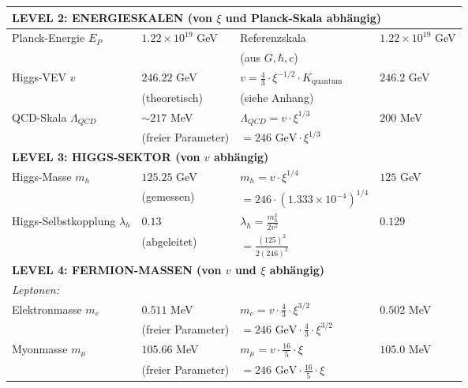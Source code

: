 \documentclass[12pt,a4paper]{article}
\begin{document}
\begin{longtable}{p{4.5cm}p{3.5cm}p{3.5cm}p{3.5cm}}
		\midrule
		\multicolumn{4}{l}{\textbf{LEVEL 2: ENERGIESKALEN (von $\xi$ und Planck-Skala abhängig)}} \\
		\midrule
		
		Planck-Energie $E_P$ & $1.22 \times 10^{19}$ GeV & Referenzskala & $1.22 \times 10^{19}$ GeV \\
		& & (aus $G, \hbar, c$) & \\[0.3em]
		
		Higgs-VEV $v$ & $246.22$ GeV & $v = \frac{4}{3} \cdot \xi^{-1/2} \cdot K_{\text{quantum}}$ & $246.2$ GeV \\
		& (theoretisch) & (siehe Anhang) & \\[0.3em]
		
		QCD-Skala $\Lambda_{QCD}$ & $\sim 217$ MeV & $\Lambda_{QCD} = v \cdot \xi^{1/3}$ & $200$ MeV \\
		& (freier Parameter) & $= 246 \text{ GeV} \cdot \xi^{1/3}$ & \\[0.3em]
		
		\midrule
		\multicolumn{4}{l}{\textbf{LEVEL 3: HIGGS-SEKTOR (von $v$ abhängig)}} \\
		\midrule
		
		Higgs-Masse $m_h$ & $125.25$ GeV & $m_h = v \cdot \xi^{1/4}$ & $125$ GeV \\
		& (gemessen) & $= 246 \cdot (1.333 \times 10^{-4})^{1/4}$ & \\[0.3em]
		
		Higgs-Selbstkopplung $\lambda_h$ & $0.13$ & $\lambda_h = \frac{m_h^2}{2v^2}$ & $0.129$ \\
		& (abgeleitet) & $= \frac{(125)^2}{2(246)^2}$ & \\[0.3em]
		
		\midrule
		\multicolumn{4}{l}{\textbf{LEVEL 4: FERMION-MASSEN (von $v$ und $\xi$ abhängig)}} \\
		\midrule
		
		\multicolumn{4}{l}{\textit{Leptonen:}} \\
		
		Elektronmasse $m_e$ & $0.511$ MeV & $m_e = v \cdot \frac{4}{3} \cdot \xi^{3/2}$ & $0.502$ MeV \\
		& (freier Parameter) & $= 246 \text{ GeV} \cdot \frac{4}{3} \cdot \xi^{3/2}$ & \\[0.3em]
		
		Myonmasse $m_\mu$ & $105.66$ MeV & $m_\mu = v \cdot \frac{16}{5} \cdot \xi$ & $105.0$ MeV \\
		& (freier Parameter) & $= 246 \text{ GeV} \cdot \frac{16}{5} \cdot \xi$ & \\[0.3em]
		

\end{longtable}
\end{document}
